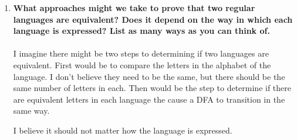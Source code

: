 \begin{enumerate}
\newpage
\item \textbf{What approaches might we take to prove that two regular languages are equivalent? Does it depend on the way in which each language is expressed? List as many ways as you can think of.}
\\\\
I imagine there might be two steps to determining  if two languages are equivalent.  First would be to compare the letters in the alphabet of the language.  I don't believe they need to be the same, but there should be the same number of letters in each.  Then would be the step to determine if there are equivalent letters in each language the cause a DFA to transition in the same way.

I believe it should not matter how the language is expressed.  
		
		
\end{enumerate}


